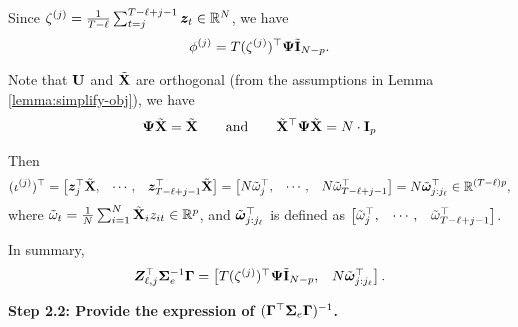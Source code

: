 		Since $\zeta^{(j)} = \frac{1}{T - \ell} \sum_{t=j}^{T - \ell+j-1} \bm{z}_t \in \mathbb{R}^{N}$, we have
		\[\phi^{(j)} = T (\zeta^{(j)})^\top \bm{\Psi} \tilde{\mathbf{I}}_{N-p}.\]
		
		
		Note that $\mathbf{U}$ and $\tilde{\mathbf{X}}$ are orthogonal (from the assumptions in Lemma \ref{lemma:simplify-obj}), we have
		\begin{align}\label{eqn:psi-simplify}
		    \bm{\Psi} \tilde{\mathbf{X}} = \tilde{\mathbf{X}} \qquad \text{and} \qquad \tilde{\mathbf{X}}^\top \bm{\Psi} \tilde{\mathbf{X}} = N \cdot \mathbf{I}_p 
		\end{align}
		
		Then $$(\iota^{(j)})^\top = \begin{bmatrix}
		\bm{z}_j^\top \tilde{\mathbf{X}}, & \cdots, &  \bm{z}_{T - \ell+j-1}^\top  \tilde{\mathbf{X}}
		\end{bmatrix} = \begin{bmatrix}
		N \tilde \omega_j^\top, & \cdots, & N \tilde \omega_{T - \ell+j-1}^\top
		\end{bmatrix} = N \tilde{\bm{\omega}}_{j:j_\ell}^\top  \in \mathbb{R}^{(T-\ell)p},$$
		where $\tilde \omega_t = \frac{1}{N} \sum_{i = 1}^N \tilde{\mathbf{X}}_i z_{it} \in \mathbb{R}^p$, and $\tilde{\bm{\omega}}_{j:j_\ell}^\top $ is defined as $\begin{bmatrix}
		\tilde \omega_j^\top, & \cdots, &  \tilde \omega_{T - \ell+j-1}^\top
		\end{bmatrix} $.
		
		In summary, 
		\[\bm{Z}_{\ell,j}^\top \bm{\Sigma}_e^{-1} \bm{\Gamma} = \begin{bmatrix}
		T (\zeta^{(j)})^\top \bm{\Psi} \tilde{\mathbf{I}}_{N-p}, & N \tilde{\bm{\omega}}_{j:j_\ell}^\top
		\end{bmatrix}. \]
		
    \textbf{Step 2.2: Provide the expression of $(\bm{\Gamma}^\top \bm{\Sigma}_e \bm{\Gamma})^{-1}$.}
  
